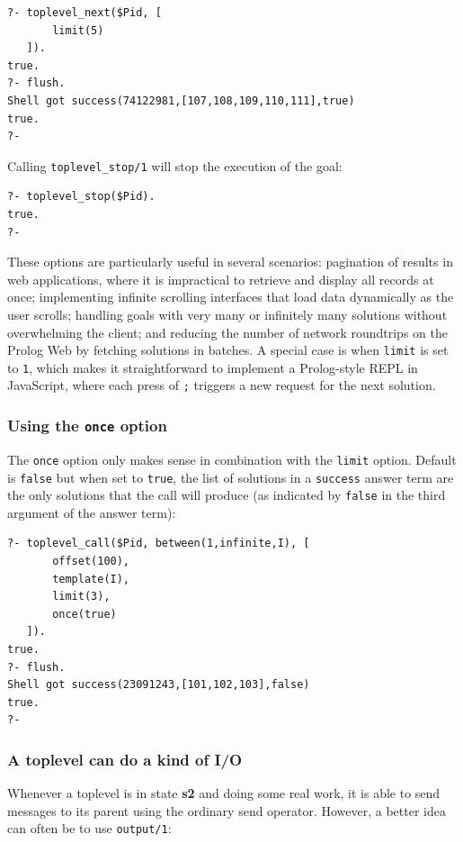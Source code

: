 \begin{verbatim}
?- toplevel_next($Pid, [ 
       limit(5)
   ]).
true.
?- flush.
Shell got success(74122981,[107,108,109,110,111],true)
true.
?-
\end{verbatim}

\noindent Calling \texttt{toplevel\_stop/1} will stop the execution of the goal:

\begin{verbatim}
?- toplevel_stop($Pid).
true.
?-
\end{verbatim}

\medskip
\noindent These options are particularly useful in several scenarios: pagination of results in web applications, where it is impractical to retrieve and display all records at once; implementing infinite scrolling interfaces that load data dynamically as the user scrolls; handling goals with very many or infinitely many solutions without overwhelming the client; and reducing the number of network roundtrips on the Prolog Web by fetching solutions in batches. A special case is when \texttt{limit} is set to \texttt{1}, which makes it straightforward to implement a Prolog-style REPL in JavaScript, where each press of \texttt{;} triggers a new request for the next solution.

\subsubsection{Using the \texttt{once} option}\label{sec:toplevel-once}

The \texttt{once} option only makes sense in combination with the \texttt{limit} option. Default is \texttt{false} but when set to \texttt{true}, the list of solutions in a \texttt{success} answer term are the only solutions that the call will produce (as indicated by \texttt{false} in the third argument of the answer term):

\begin{verbatim}
?- toplevel_call($Pid, between(1,infinite,I), [
       offset(100),
       template(I),
       limit(3),
       once(true)
   ]).
true.
?- flush.
Shell got success(23091243,[101,102,103],false)
true.
?-
\end{verbatim}


\subsubsection{A toplevel can do a kind of I/O}\label{sec:toplevel-io}

\noindent Whenever a toplevel is in state \textbf{s2} and doing some real work, it is able to send messages to its parent using the ordinary send operator. However, a better idea can often be to use \texttt{output/1}:

